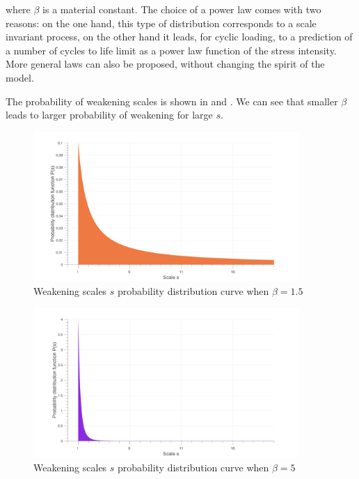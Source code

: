 where $\beta$ is a material constant. 
The choice of a power law comes with two reasons: on the one hand, this type of distribution corresponds to a scale invariant process, on the other hand it leads, for cyclic loading, to a prediction of a number of cycles to life limit as a power law function of the stress intensity. More general laws can also be proposed, without changing the spirit of the model.

The probability of weakening scales is shown in  and . We can see that smaller $\beta$ leads to larger probability of weakening for large $s$.
\begin{figure}[!h]
\centering
\includegraphics[width=0.9\textwidth]{figures//ps1.png} 
\caption{Weakening scales $s$ probability distribution curve when $\beta=1.5$ }
\label{ps1}
\end{figure}
\begin{figure}[!h]
\centering
\includegraphics[width=0.9\textwidth]{figures//ps2.png} 
\caption{Weakening scales $s$ probability distribution curve when $\beta=5$ }
\label{ps2}
\end{figure}

